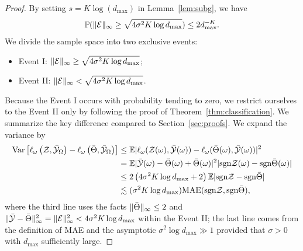 \documentclass[11pt]{article}
\theoremstyle{plain}
\theoremstyle{definition}
\def\sign{\textup{sgn}}
\begin{document}
\begin{proof}
By setting $s=K\log(d_{\max})$ in Lemma~\ref{lem:subg}, we have
\[
\mathbb{P}(\lVert\mathcal{E}\rVert_\infty\geq \sqrt{4\sigma^2K\log d_{\max}} )\leq 2d_{\max}^{-K}.
\]
We divide the sample space into two exclusive events:
\begin{itemize}
\item Event I: $\lVert\mathcal{E}\rVert_\infty\geq \sqrt{4\sigma^2K\log d_{\max}}$;
\item Event II: $\lVert\mathcal{E}\rVert_\infty< \sqrt{4\sigma^2K\log d_{\max}}$.
\end{itemize}
Because the Event I occurs with probability tending to zero, we restrict ourselves to the Event II only by following the proof of Theorem~\ref{thm:classification}.   We summarize the key difference compared to Section~\ref{sec:proofs}. 
We expand the variance by 
\begin{align}
    \label{eq:variance2}
    \text{Var}\left[\ell_\omega\left(\tZ,\bar\tY_\Omega\right)-\ell_\omega\left(\bar\Theta,\bar\tY_\Omega\right)\right]&\leq \mathbb{E}|\ell_\omega(\tZ(\omega),\bar\tY(\omega))-\ell_\omega(\bar\Theta(\omega),\bar\tY(\omega))|^2\notag \\
    &= \mathbb{E}|\bar \tY(\omega)-\bar \Theta(\omega)+\bar\Theta(\omega)|^2|\text{sgn}\tZ(\omega)-\text{sgn}\bar\Theta(\omega)| \notag \\
    &\leq 2\left(4 \sigma^2K\log d_{\max}+2\right) \mathbb{E}|\text{sgn}\tZ-\text{sgn}\bar\Theta| \notag \\
    & \lesssim (\sigma^2K \log d_{\max}) \text{MAE}(\sign \tZ, \sign \bar \Theta),
    \end{align}
where the third line uses the facts $\lVert\bar \Theta\rVert_\infty\leq 2$ and $\lVert\bar {\mathcal{Y}}-\bar \Theta\rVert_\infty^2=\lVert\mathcal{E}\rVert_\infty^2<4 \sigma^2K\log d_{\max}$ within the Event II; the last line comes from the definition of MAE and the asymptotic $\sigma^2\log d_{\max}\gg 1$ provided that $\sigma>0$ with $d_{\max}$ sufficiently large. 


\end{proof}
\end{document}
